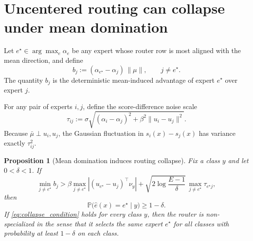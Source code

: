 \documentclass[11pt]{article}
\newtheorem{proposition}{Proposition}
\begin{document}
\section{Uncentered routing can collapse under mean domination}

Let $e^\star\in\arg\max_e \alpha_e$ be any expert whose router row is most aligned with the mean direction, and define
\begin{equation}
    b_j := (\alpha_{e^\star}-\alpha_j)\,\|\mu\|,
    \qquad j\neq e^\star.
\end{equation}
The quantity $b_j$ is the deterministic mean-induced advantage of expert $e^\star$ over expert $j$.

For any pair of experts $i,j$, define the score-difference noise scale
\begin{equation}
    \tau_{ij} := \sigma \sqrt{(\alpha_i-\alpha_j)^2 + \beta^2\|u_i-u_j\|^2}.
\end{equation}
Because $\bar\mu\perp u_i,u_j$, the Gaussian fluctuation in $s_i(x)-s_j(x)$ has variance exactly $\tau_{ij}^2$.

\begin{proposition}[Mean domination induces routing collapse]
Fix a class $y$ and let $0<\delta<1$. If
\begin{equation}
    \min_{j\neq e^\star} b_j
    >
    \beta \max_{j\neq e^\star}\left| (u_{e^\star}-u_j)^\top \nu_y \right|
    +
    \sqrt{2\log\frac{E-1}{\delta}}\,\max_{j\neq e^\star}\tau_{e^\star j},
    \label{eq:collapse_condition}
\end{equation}
then
\begin{equation}
    \mathbb P\bigl(\hat e(x)=e^\star\mid y\bigr) \ge 1-\delta.
\end{equation}
If \eqref{eq:collapse_condition} holds for every class $y$, then the router is non-specialized in the sense that it selects the same expert $e^\star$ for all classes with probability at least $1-\delta$ on each class.
\end{proposition}
\end{document}
